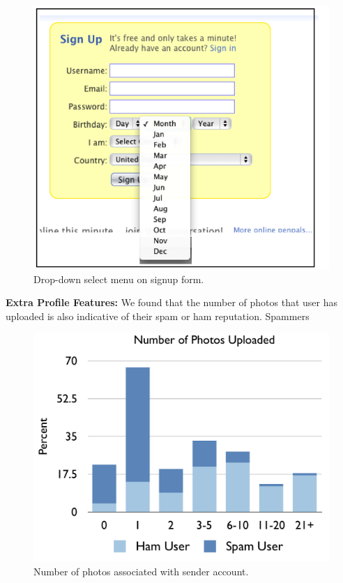 \documentclass[preprint]{acm_proc_article-sp}
\begin{document}
\begin{figure}[h]
    \centering
    \includegraphics[width=\linewidth]{figures/dropdown.png}
    \caption{Drop-down select menu on signup form.}
    \label{fig:drop}
\end{figure}



\textbf{Extra Profile Features:} We found that the number of photos that user has uploaded is also indicative of their spam or ham reputation. Spammers 

\begin{figure}[h]
    \centering
    \includegraphics[width=\linewidth]{figures/photos.pdf}
    \caption{Number of photos associated with sender account.}
    \label{fig:photos}
\end{figure}
\end{document}
